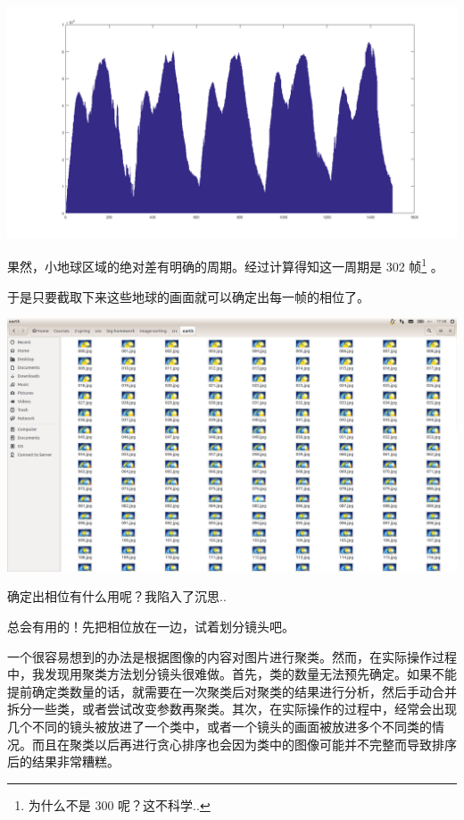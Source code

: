 \documentclass[a4paper, fontset=none]{article}
\begin{document}
\begin{center}
  \includegraphics[width=\textwidth]{./earth.png}
\end{center}

果然，小地球区域的绝对差有明确的周期。经过计算得知这一周期是 302 帧\footnote{为什么不是 300 呢？这不科学..} 。

于是只要截取下来这些地球的画面就可以确定出每一帧的相位了。

\begin{center}
  \includegraphics[width=\textwidth]{./many_earth.png}
\end{center}

确定出相位有什么用呢？我陷入了沉思..

总会有用的！先把相位放在一边，试着划分镜头吧。

一个很容易想到的办法是根据图像的内容对图片进行聚类。然而，在实际操作过程中，我发现用聚类方法划分镜头很难做。首先，类的数量无法预先确定。如果不能提前确定类数量的话，就需要在一次聚类后对聚类的结果进行分析，然后手动合并拆分一些类，或者尝试改变参数再聚类。其次，在实际操作的过程中，经常会出现几个不同的镜头被放进了一个类中，或者一个镜头的画面被放进多个不同类的情况。而且在聚类以后再进行贪心排序也会因为类中的图像可能并不完整而导致排序后的结果非常糟糕。
\end{document}
